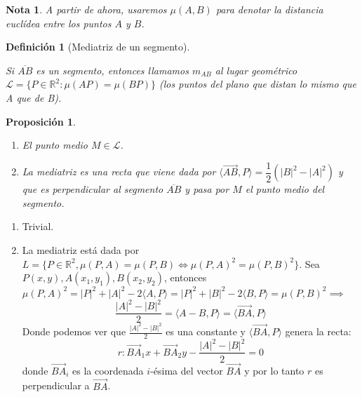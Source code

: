 \documentclass[11pt, a4paper]{article}
\makeatletter
\newif\IfInSansMode
\let\oldsf\sffamily
\renewcommand*{\sffamily}{\oldsf\mathversion{sans}\InSansModetrue}
\let\oldnorm\normalfont
\renewcommand*{\normalfont}{\oldnorm\InSansModefalse\mathversion{normal}}
\renewenvironment{proof}[1][\proofname] {\vspace{-15pt}\par\pushQED{\qed}\normalfont\topsep6\p@\@plus6\p@\relax\trivlist\item[\hskip\labelsep\it#1\@addpunct{.}]\ignorespaces}{\popQED\endtrivlist\@endpefalse}
\newcommand{\R}{\mathbb{R}}
\renewcommand{\vec}{\overrightarrow}
\renewenvironment{proof}[1][\proofname] {\par\pushQED{\qed}\normalfont\topsep6\p@\@plus6\p@\relax\trivlist\item[\hskip\labelsep\itshape\sffamily#1\@addpunct{.}]\ignorespaces}{\popQED\endtrivlist\@endpefalse}
\theoremstyle{theorem-style}
\newtheorem{nprop}{Proposición}[section]
\theoremstyle{definition-style}
\newtheorem{ndef}{Definición}[section]
\theoremstyle{remark-style}
\newtheorem*{nota}{Nota}
\theoremstyle{example-style}
\newenvironment{nlist}
{\begin{enumerate}
    \renewcommand\labelenumi{(\emph{\roman{enumi})}}}
  {\end{enumerate}}
\makeatother
\begin{document}
\begin{nota}
  A partir de ahora, usaremos $\mu(A,B)$ para denotar la distancia euclídea entre los puntos $A$ y $B$.
\end{nota}

\begin{ndef}[Mediatriz de un segmento] \hfill\\
\begin{minipage}[c]{0.70\textwidth}
  Si $\overline{AB}$ es un segmento, entonces llamamos $m_{AB}$  al lugar geométrico $\mathcal{L}=\{P \in \R^2 : \mu(AP) = \mu(BP)\}$ (los puntos del plano que distan lo mismo que A que de B).
\end{minipage}
\begin{minipage}[]{0.27\textwidth}
  \begin{center}
  \sffamily
\end{center}
\end{minipage}
\end{ndef}

\begin{nprop}\hfill
  \begin{nlist}
    \item El punto medio $M \in \mathcal{L}$. 
    \item La mediatriz es una recta que viene dada por $\langle\vec{AB},P\rangle  = \dfrac{1}{2}(|B|^2-|A|^2)$ y que es perpendicular al segmento $\overline{AB}$ y pasa por $M$ el punto medio del segmento.
  \end{nlist}
\end{nprop}

\begin{proof}\hfill
  \begin{nlist}
    \item Trivial.
    \item La mediatriz está dada por $L = \{P\in\mathbb{R}^2, \mu(P,A) = \mu(P,B)\iff \mu(P,A)^2 = \mu(P,B)^2\}$. Sea $P(x,y),A(x_1,y_1),B(x_2,y_2)$, entonces $\mu(P,A)^2 = |P|^2+|A|^2-2\langle A,P\rangle  = |P|^2+|B|^2-2\langle B,P\rangle = \mu(P,B)^2 \implies$ $$ \frac{|A|^2-|B|^2}{2} =\langle A-B,P\rangle  = \langle\vec{BA},P\rangle $$
    Donde podemos ver que $\frac{|A|^2-|B|^2}{2}$ es una constante y $\langle\vec{BA},P\rangle $ genera la recta:
    \[
      r: \vec{BA}_1x+ \vec{BA}_2y - \frac{|A|^2-|B|^2}{2} = 0
    \]
    donde $\vec{BA}_i$ es la coordenada $i$-ésima del vector $\vec{BA}$ y por lo tanto $r$ es perpendicular a $\vec{BA}$.
  \end{nlist}
\end{proof}
\end{document}
